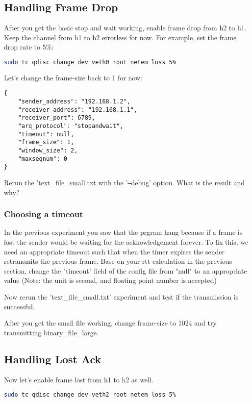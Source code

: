 \documentclass[11pt]{article}
\begin{document}
\subsection{Handling Frame Drop}
After you get the basic stop and wait working, enable frame drop from h2 to h1. Keep the channel from h1 to h2 errorless for now. For example, set the frame drop rate to 5\%:
\begin{lstlisting}[language=bash]
sudo tc qdisc change dev veth0 root netem loss 5%
\end{lstlisting}
Let's change the frame-size back to 1 for now:

\begin{minipage}{\linewidth}
\begin{lstlisting}[caption={Configuration For Large File}]
{
    "sender_address": "192.168.1.2",
    "receiver_address": "192.168.1.1",
    "receiver_port": 6789,
    "arq_protocol": "stopandwait",
    "timeout": null,
    "frame_size": 1,
    "window_size": 2,
    "maxseqnum": 0
}
\end{lstlisting}
\end{minipage}
Rerun the 'text\_file\_small.txt with the '\texttt{--}debug' option. What is the result and why?
\subsubsection {Choosing a timeout}
In the previous experiment you saw that the prgram hang because if a frame is lost the sender would be waiting for the acknowledgement forever. To fix this, we need an appropriate timeout such that when the timer expires the sender retransmits the previous frame. Base on your rtt calculation in the previous section, change the "timeout" field of the config file from "null" to an appropriate value (Note: the unit is second, and floating point number is accepted)


\noindent Now rerun the 'text\_file\_small.txt' experiment and test if the transmission is successful.

\noindent After you get the small file working, change frame-size to 1024 and try transmitting binary\_file\_large.


\subsection {Handling Lost Ack}
Now let's enable frame lost from h1 to h2 as well.
\begin{lstlisting}[language=bash]
sudo tc qdisc change dev veth2 root netem loss 5%
\end{lstlisting}
\end{document}
